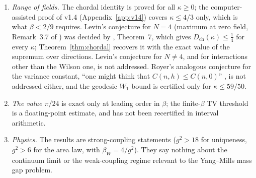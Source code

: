 \documentclass[11pt,a4paper]{article}
\theoremstyle{remark}
\theoremstyle{definition}
\theoremstyle{plain}
\theoremstyle{remark}
\newcommand{\Dch}{D_{\mathrm{ch}}}
\begin{document}
\begin{enumerate}
For the area law of \S\ref{sec:area}, the range $\beta<2/3$ is not new: Wilson's area law for $\beta<2/3$ is Corollary~7.7 of Part~II of \cite{Raj26a}, and confinement for $\beta<12/17$ is in Appendix~B of \cite{BS83}, which we read in the preprint version and compared with the journal version on the passages cited; Durhuus and Fr\"ohlich \cite{DF80} announced $\beta<2/3$ without proof (literal reading of their normalisation), and the ranges of \cite{Fro79,ABF87} and \cite{CNS25} are smaller (\S\ref{sec:areaprior}). The literature search for the area law is not exhaustive: MathSciNet was not queried, and \cite{BGDF86} and \cite{Sei82} were not consulted.
The contribution of this note is the exact field-uniform single-link coefficient for the Euclidean metric (all fields, with an analytic proof) and for the geodesic metric ($\kappa\le3\pi/8$), the certification of the latter,
the resulting thresholds $2/9$ (also in \cite{BB26}) and $\pi/16$, and the transfers of published constants.
\emph{Limitation of the literature search:} Seiler's monograph \cite{Sei82} (not obtainable), the content of
Georgii's book \cite{Geo88} (table of contents only) and Simon's book \cite{Sim93} were not consulted; any of them
may contain a Dobrushin-type statement for plaquette interactions or for $SU(2)$ gauge fields. No claim of this
note rests on them, but a priority claim for the gauge application should be read with this limitation in mind.
\item \emph{Range of fields.} The chordal identity is proved for all $\kappa\ge0$; the computer-assisted proof of v1.4 (Appendix~\ref{app:v14}) covers $\kappa\le4/3$ only, which is what $\beta<2/9$ requires.
Levin's conjecture for $N=4$ (maximum at zero field, Remark~3.7 of \cite{Lev80}) was decided by \cite{BB26}, Theorem~7, which gives $\Dch(\kappa)\le\frac14$ for every $\kappa$; Theorem~\ref{thm:chordal} recovers it with the exact value
of the supremum over directions. Levin's conjecture for $N\ne4$, and for interactions other than the Wilson one, is not addressed. Royer's analogous conjecture for the variance constant, ``one might think that $C(n,h)\leqslant C(n,0)$'' \cite[p.~38]{Roy86}, is not addressed either, and the geodesic $W_1$ bound is certified only for $\kappa\le59/50$.
\item \emph{The value $\pi/24$} is exact only at leading order in $\beta$; the finite-$\beta$ TV threshold is a
floating-point estimate, and has not been recertified in interval arithmetic.
\item \emph{Physics.} The results are strong-coupling statements ($g^2>18$ for uniqueness, $g^2>6$ for the area law, with $\beta_W=4/g^2$). They say nothing
about the continuum limit or the weak-coupling regime relevant to the Yang--Mills mass gap problem.
\end{enumerate}
\end{document}

